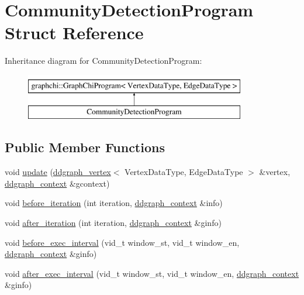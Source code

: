 \hypertarget{struct_community_detection_program}{\section{Community\-Detection\-Program Struct Reference}
\label{struct_community_detection_program}
}
Inheritance diagram for Community\-Detection\-Program\-:\begin{figure}[H]
\begin{center}
\leavevmode
\includegraphics[height=2.000000cm]{struct_community_detection_program}
\end{center}
\end{figure}
\subsection*{Public Member Functions}
\begin{DoxyCompactItemize}
\item 
void \hyperlink{struct_community_detection_program_aa371bbe8d4e79cb7cc512d9f77e9496c}{update} (\hyperlink{classddgraph_1_1ddgraph__vertex}{ddgraph\-\_\-vertex}$<$ Vertex\-Data\-Type, Edge\-Data\-Type $>$ \&vertex, \hyperlink{structddgraph_1_1ddgraph__context}{ddgraph\-\_\-context} \&gcontext)
\item 
void \hyperlink{struct_community_detection_program_a3dde791f5dec796cd9c6e0a61da114cc}{before\-\_\-iteration} (int iteration, \hyperlink{structddgraph_1_1ddgraph__context}{ddgraph\-\_\-context} \&info)
\item 
void \hyperlink{struct_community_detection_program_ad7a1b4c6b9dcb29a2b4286d123044c2e}{after\-\_\-iteration} (int iteration, \hyperlink{structddgraph_1_1ddgraph__context}{ddgraph\-\_\-context} \&ginfo)
\item 
void \hyperlink{struct_community_detection_program_aa8a15b9afd3731712ac3e01a9491d7c1}{before\-\_\-exec\-\_\-interval} (vid\-\_\-t window\-\_\-st, vid\-\_\-t window\-\_\-en, \hyperlink{structddgraph_1_1ddgraph__context}{ddgraph\-\_\-context} \&ginfo)
\item 
void \hyperlink{struct_community_detection_program_a76118f786af150806ed45fb4cb1b18e3}{after\-\_\-exec\-\_\-interval} (vid\-\_\-t window\-\_\-st, vid\-\_\-t window\-\_\-en, \hyperlink{structddgraph_1_1ddgraph__context}{ddgraph\-\_\-context} \&ginfo)
\end{DoxyCompactItemize}
